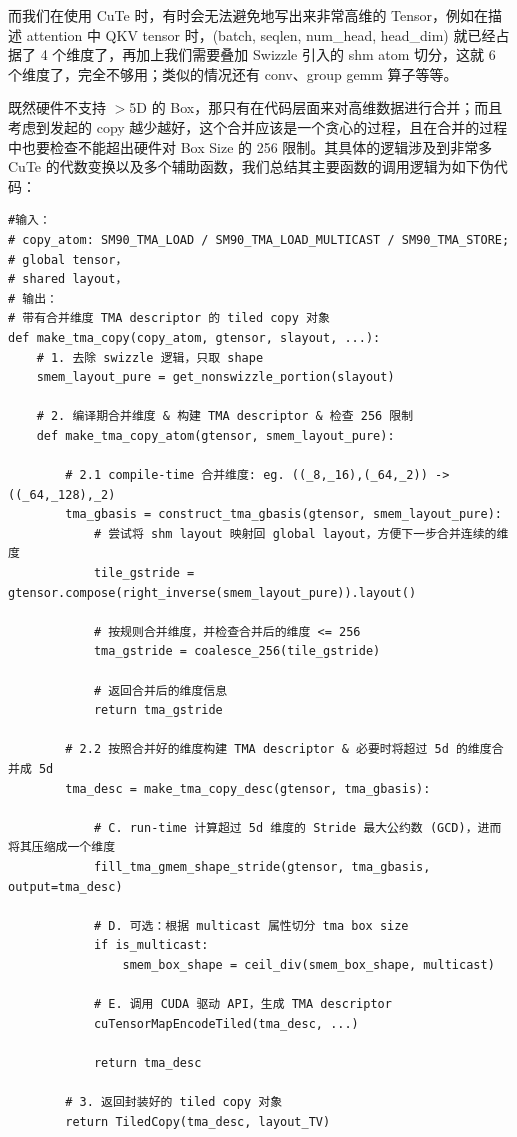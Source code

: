 而我们在使用 CuTe 时，有时会无法避免地写出来非常高维的 Tensor，例如在描述 attention 中 QKV tensor 时，(batch, seqlen, num\_head, head\_dim) 就已经占据了 4 个维度了，再加上我们需要叠加 Swizzle 引入的 shm atom 切分，这就 6 个维度了，完全不够用；类似的情况还有 conv、group gemm 算子等等。

既然硬件不支持 $>$5D 的 Box，那只有在代码层面来对高维数据进行合并；而且考虑到发起的 copy 越少越好，这个合并应该是一个贪心的过程，且在合并的过程中也要检查不能超出硬件对 Box Size 的 256 限制。其具体的逻辑涉及到非常多 CuTe 的代数变换以及多个辅助函数，我们总结其主要函数的调用逻辑为如下伪代码：

\begin{lstlisting}
#输入： 
# copy_atom: SM90_TMA_LOAD / SM90_TMA_LOAD_MULTICAST / SM90_TMA_STORE;
# global tensor，
# shared layout，
# 输出：
# 带有合并维度 TMA descriptor 的 tiled copy 对象
def make_tma_copy(copy_atom, gtensor, slayout, ...):
    # 1. 去除 swizzle 逻辑，只取 shape
    smem_layout_pure = get_nonswizzle_portion(slayout)
    
    # 2. 编译期合并维度 & 构建 TMA descriptor & 检查 256 限制
    def make_tma_copy_atom(gtensor, smem_layout_pure):
        
        # 2.1 compile-time 合并维度: eg. ((_8,_16),(_64,_2)) -> ((_64,_128),_2)
        tma_gbasis = construct_tma_gbasis(gtensor, smem_layout_pure):
            # 尝试将 shm layout 映射回 global layout，方便下一步合并连续的维度
            tile_gstride = gtensor.compose(right_inverse(smem_layout_pure)).layout()
            
            # 按规则合并维度，并检查合并后的维度 <= 256
            tma_gstride = coalesce_256(tile_gstride)
            
            # 返回合并后的维度信息
            return tma_gstride 

        # 2.2 按照合并好的维度构建 TMA descriptor & 必要时将超过 5d 的维度合并成 5d
        tma_desc = make_tma_copy_desc(gtensor, tma_gbasis):
            
            # C. run-time 计算超过 5d 维度的 Stride 最大公约数 (GCD)，进而将其压缩成一个维度
            fill_tma_gmem_shape_stride(gtensor, tma_gbasis, output=tma_desc)
            
            # D. 可选：根据 multicast 属性切分 tma box size
            if is_multicast:
                smem_box_shape = ceil_div(smem_box_shape, multicast)
            
            # E. 调用 CUDA 驱动 API，生成 TMA descriptor 
            cuTensorMapEncodeTiled(tma_desc, ...)
            
            return tma_desc

        # 3. 返回封装好的 tiled copy 对象
        return TiledCopy(tma_desc, layout_TV)
\end{lstlisting}


